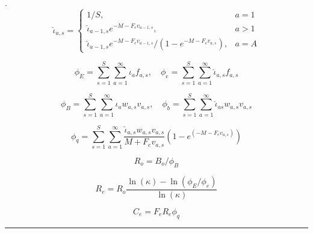\documentclass[11pt]{article}   %
\def\beq{\vspace{-5ex} \begin{fleqn} \begin{equation}}   %
\def\eeq{\end{equation} \end{fleqn} \vspace{-5ex}}     %
\def\tabline{\vspace{2ex} \hrule \vspace{2ex}}
\def\vsd{\vspace*{1ex}}     %
\def\newp{\vfill \break}
\begin{document}
\begin{fleqn}    .
\begin{equation}
\hat{\iota}_{a,s} = \left\{
\begin{array}{lll}
1 / S, & a=1\\
\hat{\iota}_{a-1,s}e^{-M -F_e v_{a-1,s}}, & a > 1 \\
\hat{\iota}_{a-1,s}e^{-M -F_e v_{a-1,s}} / (1-e^{-M-F_e v_{a,s}}), & a = A
\label{df8}
\end{array}
\right.
\end{equation}
\end{fleqn}
\vspace{2ex}

 \eec

\vspace{2ex}

\beq \phi_E=\sum_{s=1}^S\sum_{a=1}^\infty \iota_a f_{a,s}, \quad
\phi_e=\sum_{s=1}^S\sum_{a=1}^\infty \hat{\iota}_{a,s} f_{a,s}          \label{df9} \eeq \vsd \vsd \vsd

\vspace{2ex}

\beq \phi_B=\sum_{s=1}^S\sum_{a=1}^\infty \iota_a w_{a,s} v_{a,s}, \quad
\phi_b=\sum_{s=1}^S\sum_{a=1}^\infty \hat{\iota}_{as} w_{a,s} v_{a,s}       \label{df10} \eeq \vsd \vsd \vsd

\vspace{2ex}

\beq\phi_q=\sum_{s=1}^S\sum_{a=1}^\infty
                \frac{ \hat{\iota}_{a,s} w_{a,s} v_{a,s}}{M+F_ev_{a,s}}
                \left(1-e^{(-M-F_ev_{a,s})}\right)               \label{df11} \eeq \vsd \vsd \vsd

 \eec

\beq R_o=B_o/ \phi_B   \label{df12} \eeq \vsd \vsd \vsd

\vsd
\beq R_e=R_o \dfrac{\ln(\kappa)-\ln(\phi_E/\phi_e)}{\ln(\kappa)}  \label{df13} \eeq \vsd \vsd \vsd

 
\vsd
\beq C_e=F_e R_e \phi_q   \label{df14} \eeq \vsd \vsd \vsd


\noindent \hrule %
\newp
\end{document}
